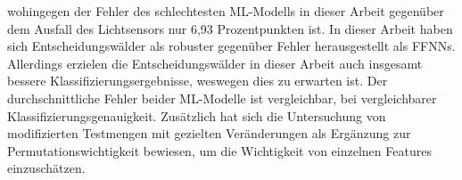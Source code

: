 wohingegen der Fehler des schlechtesten ML-Modells in dieser Arbeit gegenüber dem Ausfall des Lichtsensors nur 6,93 Prozentpunkten ist.
\newline
\newline
In dieser Arbeit haben sich Entscheidungswälder als robuster gegenüber Fehler herausgestellt als FFNNs.
Allerdings erzielen die Entscheidungswälder in dieser Arbeit auch insgesamt bessere Klassifizierungsergebnisse, weswegen dies zu erwarten ist.
Der durchschnittliche Fehler beider ML-Modelle ist vergleichbar, bei vergleichbarer Klassifizierungsgenauigkeit.
Zusätzlich hat sich die Untersuchung von modifizierten Testmengen mit gezielten Veränderungen als Ergänzung zur Permutationswichtigkeit bewiesen,
um die Wichtigkeit von einzelnen Features einzuschätzen.